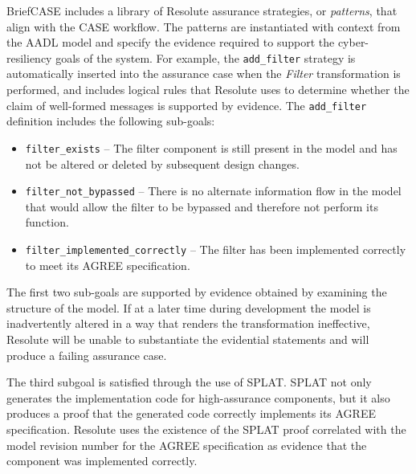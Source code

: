 BriefCASE includes a library of Resolute assurance strategies, or \emph{patterns}, that align with
the CASE workflow. The patterns are instantiated with context from the AADL model and specify the
evidence required to support the cyber-resiliency goals of the system. For example, the
\texttt{add\_filter} strategy is automatically inserted into the assurance case when the
\textit{Filter} transformation is performed, and includes logical rules that Resolute uses to
determine whether the claim of well-formed messages is supported by evidence. The \texttt{add\_filter}
definition 
includes the following sub-goals:
\begin{itemize} 
\item \texttt{filter\_exists} -- The filter component is still present in the model and has not be 
altered or deleted by subsequent design changes. 
\item \texttt{filter\_not\_bypassed} -- There is no alternate information flow in the model that 
would allow the filter to be bypassed and therefore not perform its function.   
\item \texttt{filter\_implemented\_correctly} -- The filter has been implemented correctly 
to meet its AGREE specification.  
\end{itemize}

The first two sub-goals are supported by evidence obtained by examining the structure of the model. 
If at a later time during development the model is inadvertently altered in a way that renders the transformation
ineffective, Resolute will be unable to substantiate the evidential statements and will
produce a failing assurance case.

The third subgoal is satisfied through the use of SPLAT. SPLAT not only generates the implementation code for
high-assurance components, but it also produces a proof that the generated code correctly 
implements its AGREE specification. Resolute uses the existence of the
SPLAT proof correlated with the model revision number for the AGREE specification
as evidence that the component was implemented correctly.





